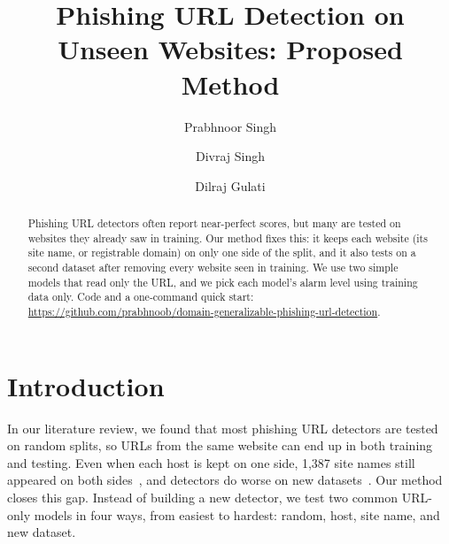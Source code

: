 \documentclass[sigconf,nonacm]{acmart}
\begin{document}
\title{Phishing URL Detection on Unseen Websites: Proposed Method}
\author{Prabhnoor Singh}
\author{Divraj Singh}
\author{Dilraj Gulati}
\begin{abstract}
Phishing URL detectors often report near-perfect scores, but many are tested on websites they already saw in training. Our method fixes this: it keeps each website (its site name, or registrable domain) on only one side of the split, and it also tests on a second dataset after removing every website seen in training. We use two simple models that read only the URL, and we pick each model's alarm level using training data only. Code and a one-command quick start: \url{https://github.com/prabhnoob/domain-generalizable-phishing-url-detection}.
\end{abstract}
\maketitle

\section{Introduction}
In our literature review, we found that most phishing URL detectors are tested on random splits, so URLs from the same website can end up in both training and testing. Even when each host is kept on one side, 1,387 site names still appeared on both sides~\cite{ahamed}, and detectors do worse on new datasets~\cite{rashid}. Our method closes this gap. Instead of building a new detector, we test two common URL-only models in four ways, from easiest to hardest: random, host, site name, and new dataset.
\end{document}
